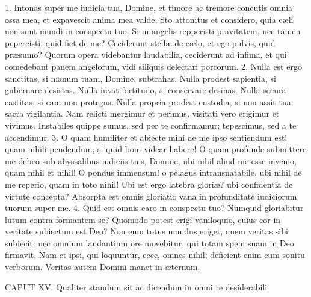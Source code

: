 1. Intonas super me iudicia tua, Domine, et timore ac tremore concutis omnia ossa mea, et expavescit anima mea valde. Sto attonitus et considero, quia cæli non sunt mundi in conspectu tuo. Si in angelis repperisti pravitatem, nec tamen pepercisti, quid fiet de me? Ceciderunt stellæ de cælo, et ego pulvis, quid præsumo? Quorum opera videbantur laudabilia, ceciderunt ad infima, et qui comedebant panem angelorum, vidi siliquis delectari porcorum.
2. Nulla est ergo sanctitas, si manum tuam, Domine, subtrahas. Nulla prodest sapientia, si gubernare desistas. Nulla iuvat fortitudo, si conservare desinas. Nulla secura castitas, si eam non protegas. Nulla propria prodest custodia, si non assit tua sacra vigilantia. Nam relicti mergimur et perimus, visitati vero erigimur et vivimus. Instabiles quippe sumus, sed per te confirmamur; tepescimus, sed a te accendimur.
3. O quam humiliter et abiecte mihi de me ipso sentiendum est! quam nihili pendendum, si quid boni videar habere! O quam profunde submittere me debeo sub abyssalibus iudiciis tuis, Domine, ubi nihil aliud me esse invenio, quam nihil et nihil! O pondus immensum! o pelagus intransnatabile, ubi nihil de me reperio, quam in toto nihil! Ubi est ergo latebra gloriæ? ubi confidentia de virtute concepta? Absorpta est omnis gloriatio vana in profunditate iudiciorum tuorum super me.
4. Quid est omnis caro in conspectu tuo? Numquid gloriabitur lutum contra formantem se? Quomodo potest erigi vaniloquio, cuius cor in veritate subiectum est Deo? Non eum totus mundus eriget, quem veritas sibi subiecit; nec omnium laudantium ore movebitur, qui totam spem suam in Deo firmavit. Nam et ipsi, qui loquuntur, ecce, omnes nihil; deficient enim cum sonitu verborum. Veritas autem Domini manet in æternum.


CAPUT XV.
Qualiter standum sit ac dicendum in omni re desiderabili

